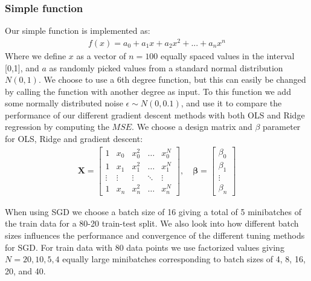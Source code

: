 \documentclass[11pt]{article}
\begin{document}
\subsubsection*{Simple function}
Our simple function is implemented as:
\begin{align*}
    f(x) = a_0 + a_1 x + a_2 x^2 + ... + a_n x^n
\end{align*}
Where we define $x$ as a vector of $n=100$ equally spaced values in the interval [0,1], and $a$ as randomly picked values from a standard normal distribution $N(0,1)$. We choose to use a 6th degree function, but this can easily be changed by calling the function with another degree as input.
To this function we add some normally distributed noise $\epsilon\sim N(0,0.1)$, and use it to compare the performance of our different gradient descent methods with both OLS and Ridge regression by computing the $MSE$. We choose a design matrix and $\beta$ parameter for OLS, Ridge and gradient descent:
\begin{align*}
    \boldsymbol{X} = \begin{bmatrix}
        1      & x_0    & x_0^2  & \hdots & x_0^N  \\
        1      & x_1    & x_1^2  & \hdots & x_1^N  \\
        \vdots & \vdots & \vdots & \ddots & \vdots \\
        1      & x_n    & x_n^2  & \hdots & x_n^N
    \end{bmatrix}
    , \quad
    \boldsymbol{\beta} =
    \begin{bmatrix}
        \beta_0 \\
        \beta_1 \\
        \vdots  \\
        \beta_n
    \end{bmatrix}
\end{align*}

When using SGD we choose a batch size of 16 giving a total of 5 minibatches of the train data for a 80-20 train-test split. We also look into how different batch sizes influences the performance and convergence of the different tuning methods for SGD. For train data with 80 data points we use factorized values giving $N=20, 10, 5, 4$ equally large minibatches corresponding to batch sizes of 4, 8, 16, 20, and 40.
\end{document}
